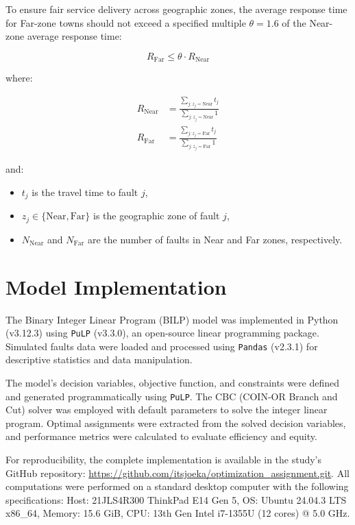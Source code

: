 \documentclass[11pt]{article}
\begin{document}
To ensure fair service delivery across geographic zones, the average response time for Far-zone towns should not exceed a specified multiple $\theta = 1.6$ of the Near-zone average response time:

\begin{equation}
R_{\text{Far}} \leq \theta \cdot R_{\text{Near}}
\end{equation}

where:

\begin{align}
R_{\text{Near}} &= \frac{\sum_{j: z_j = \text{Near}} t_j } {\sum_{j: z_j = \text{Near}}1} \\
R_{\text{Far}}  &= \frac{\sum_{j: z_j = \text{Far}} t_j }{\sum_{j: z_j = \text{Far}}1}
\end{align}

and:
\begin{itemize}
    \item $t_j$ is the travel time to fault $j$,
    \item $z_j \in \{\text{Near}, \text{Far}\}$ is the geographic zone of fault $j$,
    \item $N_{\text{Near}}$ and $N_{\text{Far}}$ are the number of faults in Near and Far zones, respectively.
\end{itemize}


\section*{Model Implementation}

The Binary Integer Linear Program (BILP) model was implemented in Python (v3.12.3) using \texttt{PuLP} (v3.3.0), an open-source linear programming package. Simulated faults data were loaded and processed using \texttt{Pandas} (v2.3.1) for descriptive statistics and data manipulation. 

The model's decision variables, objective function, and constraints were defined and generated programmatically using \texttt{PuLP}. The CBC (COIN-OR Branch and Cut) solver was employed with default parameters to solve the integer linear program. Optimal assignments were extracted from the solved decision variables, and performance metrics were calculated to evaluate efficiency and equity.

For reproducibility, the complete implementation is available in the study's GitHub repository: \url{https://github.com/itsjoeka/optimization_assignment.git}. All computations were performed on a standard desktop computer with the following specifications: Host: 21JLS4R300 ThinkPad E14 Gen 5, OS: Ubuntu 24.04.3 LTS x86\_64, Memory: 15.6 GiB, CPU: 13th Gen Intel i7-1355U (12 cores) @ 5.0 GHz.
\end{document}
